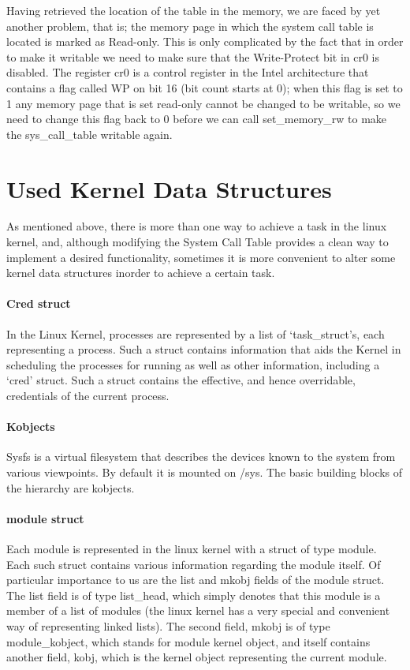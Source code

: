 \documentclass{article}
\begin{document}
    Having retrieved the location of the table in the memory, we are faced by yet another problem, that is; the memory page in which the system call table is located is marked as Read-only. This is only complicated by the fact that in order to make it writable we need to make sure that the Write-Protect bit in cr0 is disabled. The register cr0 is a control register in the Intel architecture that contains a flag called WP on bit 16 (bit count starts at 0); when this flag is set to 1 any memory page that is set read-only cannot be changed to be writable, so we need to change this flag back to 0 before we can call set\_memory\_rw to make the sys\_call\_table writable again.
    
\section{Used Kernel Data Structures}

    As mentioned above, there is more than one way to achieve a task in the linux kernel, and, although modifying the System Call Table provides a clean way to implement a desired functionality, sometimes it is more convenient to alter some kernel data structures inorder to achieve a certain task.
    
    \paragraph{Cred struct} In the Linux Kernel, processes are represented by a list of `task\_struct's, each representing a process. Such a struct contains information that aids the Kernel in scheduling the processes for running as well as other information, including a `cred' struct. Such a struct contains the effective, and hence overridable, credentials of the current process.
    
    \paragraph{Kobjects} Sysfs is a virtual filesystem that describes the devices known to the system from various viewpoints. By default it is mounted on /sys. The basic building blocks of the hierarchy are kobjects.
    
    \paragraph{module struct} Each module is represented in the linux kernel with a struct of type module. Each such struct contains various information regarding the module itself. Of particular importance to us are the list and mkobj fields of the module struct. The list field is of type list\_head, which simply denotes that this module is a member of a list of modules (the linux kernel has a very special and convenient way of representing linked lists). The second field, mkobj is of type module\_kobject, which stands for module kernel object, and itself contains another field, kobj, which is the kernel object representing the current module.
    
\end{document}
